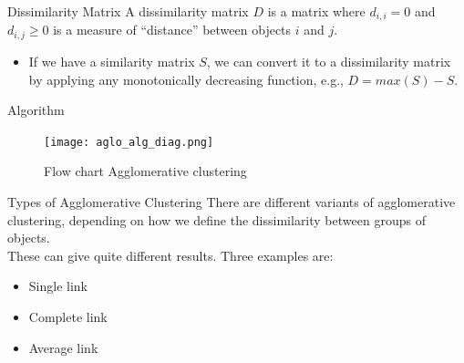 \documentclass{beamer}
\begin{document}
\begin{frame}{Dissimilarity Matrix}
A dissimilarity matrix $D$ is a matrix where $d_{i,i} = 0$ and $d_{i,j}\geq 0$ is a measure of ``distance'' between objects $i$ and $j$. 
\begin{itemize}
\item If we have a similarity matrix $S$, we
can convert it to a dissimilarity matrix by applying any monotonically decreasing function, e.g., $D=max(S)-S$.
\end{itemize}
\end{frame}





\begin{frame}{Algorithm}
\begin{figure}
        \centering
        \texttt{[image: aglo\_alg\_diag.png]}
        \label{fig:enter-label}
        \caption{Flow chart Agglomerative clustering}
\end{figure}
\end{frame}




\begin{frame}{Types of Agglomerative Clustering}
 There are different variants of agglomerative clustering, depending on how we define
the dissimilarity between groups of objects. \\\vspace{0.5cm}
These can give quite different results. Three examples are:\\\vspace{0.5cm}
\begin{itemize}
    \item Single link
    \item Complete link
    \item Average link
\end{itemize}

\end{frame}
\end{document}
